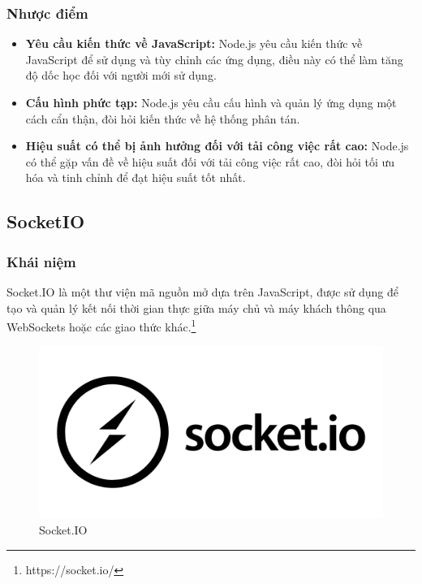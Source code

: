 \subsubsection{Nhược điểm}
\begin{itemize}
  \item \textbf{Yêu cầu kiến thức về JavaScript:} Node.js yêu cầu kiến thức về JavaScript để sử dụng và tùy chỉnh các ứng dụng, điều này có thể làm tăng độ dốc học đối với người mới sử dụng.
  \item \textbf{Cấu hình phức tạp:} Node.js yêu cầu cấu hình và quản lý ứng dụng một cách cẩn thận, đòi hỏi kiến thức về hệ thống phân tán.
  \item \textbf{Hiệu suất có thể bị ảnh hưởng đối với tải công việc rất cao:} Node.js có thể gặp vấn đề về hiệu suất đối với tải công việc rất cao, đòi hỏi tối ưu hóa và tinh chỉnh để đạt hiệu suất tốt nhất.
\end{itemize}
\subsection{SocketIO}
\subsubsection{Khái niệm}
\noindent Socket.IO là một thư viện mã nguồn mở dựa trên JavaScript, được sử dụng để tạo và quản lý kết nối thời gian thực giữa máy chủ và máy khách thông qua WebSockets hoặc các giao thức khác.\footnote{https://socket.io/}
\begin{figure}[H]
  \begin{center}
    \includegraphics[scale=0.35]{images/hieu/phuluc/socketio.png}
    \caption{Socket.IO}
  \end{center}
\end{figure}
